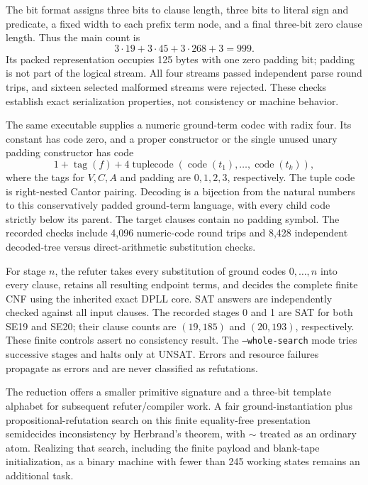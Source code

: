 The bit format assigns three bits to clause length, three bits to
literal sign and predicate, a fixed width to each prefix term node,
and a final three-bit zero clause length.  Thus the main count is
\[
 3\cdot19+3\cdot45+3\cdot268+3=999.
\]
Its packed representation occupies 125 bytes with one zero padding bit;
padding is not part of the logical stream.  All four streams passed
independent parse round trips, and sixteen selected malformed streams
were rejected.  These checks establish exact serialization properties,
not consistency or machine behavior.

The same executable supplies a numeric ground-term codec with radix
four.  Its constant has code zero, and a proper constructor or the
single unused unary padding constructor has code
\[
 1+\operatorname{tag}(f)+4\operatorname{tuplecode}
       (\operatorname{code}(t_1),\ldots,\operatorname{code}(t_k)),
\]
where the tags for $V,C,A$ and padding are $0,1,2,3$, respectively.
The tuple code is right-nested Cantor pairing.  Decoding is a bijection
from the natural numbers to this conservatively padded ground-term
language, with every child code strictly below its parent.  The target
clauses contain no padding symbol.  The recorded checks include 4,096
numeric-code round trips and 8,428 independent decoded-tree versus
direct-arithmetic substitution checks.

For stage $n$, the refuter takes every substitution of ground codes
$0,\ldots,n$ into every clause, retains all resulting endpoint terms,
and decides the complete finite CNF using the inherited exact DPLL core.
SAT answers are independently checked against all input clauses.  The
recorded stages 0 and 1 are SAT for both SE19 and SE20; their clause
counts are $(19,185)$ and $(20,193)$, respectively.  These finite controls
assert no consistency result.  The \texttt{--whole-search} mode tries
successive stages and halts only at UNSAT.  Errors and resource failures
propagate as errors and are never classified as refutations.

The reduction offers a smaller primitive signature and a three-bit
template alphabet for subsequent refuter/compiler work.  A fair
ground-instantiation plus propositional-refutation search on this
finite equality-free presentation semidecides inconsistency by Herbrand's
theorem, with $\sim$ treated as an ordinary atom.  Realizing that search,
including the finite payload and blank-tape initialization, as a binary
machine with fewer than 245 working states remains an additional task.
